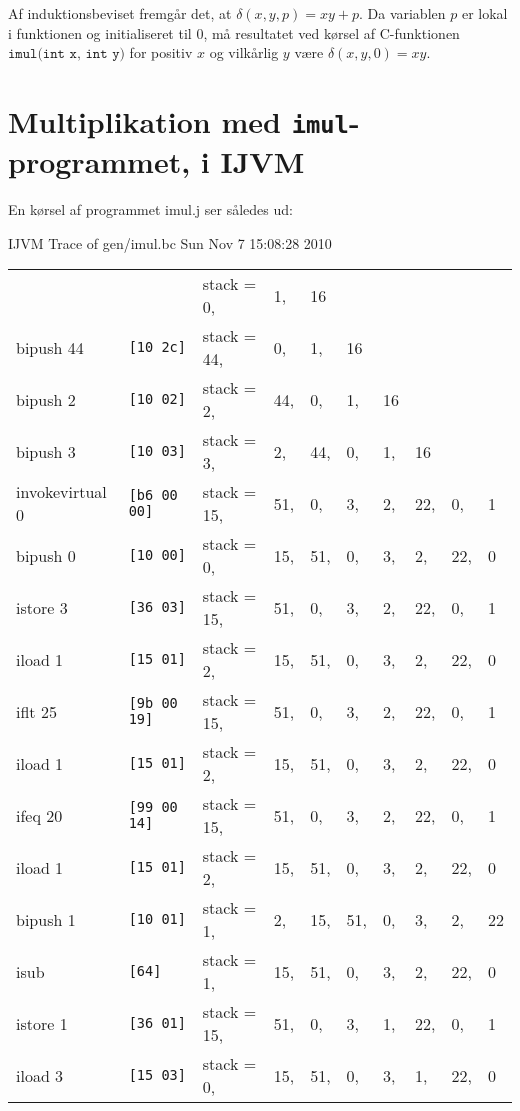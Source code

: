 \documentclass[12pt,a4paper]{article}
\newcommand{\imul}{\texttt{imul}}
\begin{document}
Af induktionsbeviset fremgår det, at $\delta(x,y,p)=xy+p$. Da variablen $p$ er
lokal i funktionen og initialiseret til $0$, må resultatet ved kørsel af
C-funktionen $\texttt{imul(int x, int y)}$ for positiv $x$ og vilkårlig $y$
være $\delta(x,y,0)=xy$.
\clearpage
\section{Multiplikation med \imul{}-programmet, i IJVM}
En kørsel af programmet imul.j ser således ud:

IJVM Trace of gen/imul.bc Sun Nov  7 15:08:28 2010

\begin{tabular}{llllllllll}
                    &                    & stack = 0,& 1,& 16 \\
bipush 44           &\texttt{[10 2c]    }& stack = 44,& 0,& 1,& 16 \\
bipush 2            &\texttt{[10 02]    }& stack = 2,& 44,& 0,& 1,& 16 \\
bipush 3            &\texttt{[10 03]    }& stack = 3,& 2,& 44,& 0,& 1,& 16 \\
invokevirtual 0     &\texttt{[b6 00 00] }& stack = 15,& 51,& 0,& 3,& 2,& 22,& 0,& 1 \\
bipush 0            &\texttt{[10 00]    }& stack = 0,& 15,& 51,& 0,& 3,& 2,& 22,& 0 \\
istore 3            &\texttt{[36 03]    }& stack = 15,& 51,& 0,& 3,& 2,& 22,& 0,& 1 \\
iload 1             &\texttt{[15 01]    }& stack = 2,& 15,& 51,& 0,& 3,& 2,& 22,& 0 \\
iflt 25             &\texttt{[9b 00 19] }& stack = 15,& 51,& 0,& 3,& 2,& 22,& 0,& 1 \\
iload 1             &\texttt{[15 01]    }& stack = 2,& 15,& 51,& 0,& 3,& 2,& 22,& 0 \\
ifeq 20             &\texttt{[99 00 14] }& stack = 15,& 51,& 0,& 3,& 2,& 22,& 0,& 1 \\
iload 1             &\texttt{[15 01]    }& stack = 2,& 15,& 51,& 0,& 3,& 2,& 22,& 0 \\
bipush 1            &\texttt{[10 01]    }& stack = 1,& 2,& 15,& 51,& 0,& 3,& 2,& 22 \\
isub                &\texttt{[64]       }& stack = 1,& 15,& 51,& 0,& 3,& 2,& 22,& 0 \\
istore 1            &\texttt{[36 01]    }& stack = 15,& 51,& 0,& 3,& 1,& 22,& 0,& 1 \\
iload 3             &\texttt{[15 03]    }& stack = 0,& 15,& 51,& 0,& 3,& 1,& 22,& 0 \\

\end{tabular}
\end{document}
